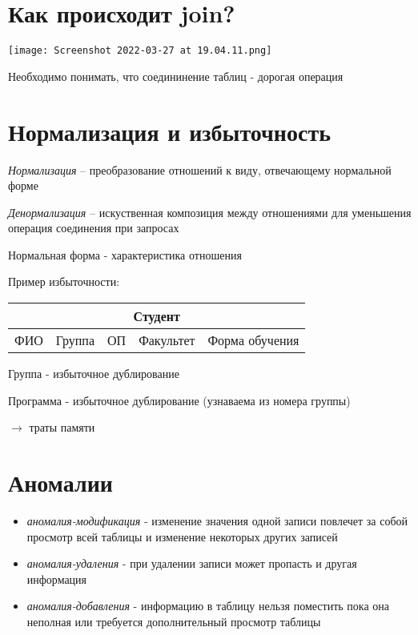 \documentclass[12pt, a4paper]{article}
\begin{document}
\section{Как происходит join?}


\texttt{[image: Screenshot 2022-03-27 at 19.04.11.png]}

Необходимо понимать, что соедининение таблиц - дорогая операция

\section{Нормализация и избыточность}

\emph{Нормализация} -- преобразование отношений к виду, отвечающему нормальной форме

\emph{Денормализация} -- искуственная композиция между отношениями для уменьшения операция соединения при запросах

Нормальная форма - характеристика отношения

Пример избыточности:

\begin{center}
    \begin{tabular}{|c|c|c|c|c|}
         \hline
         \multicolumn{5}{|c|}{Студент} \\
         \hline ФИО & Группа & ОП & Факультет & Форма обучения \\
         \hline
    \end{tabular}
\end{center}

Группа - избыточное дублирование

Программа - избыточное дублирование (узнаваема из номера группы)

$\rightarrow$ траты памяти

\section{Аномалии}

\begin{itemize}
    \item \emph{аномалия-модификация} - изменение значения одной записи повлечет за собой просмотр всей таблицы и изменение некоторых других записей
    \item \emph{аномалия-удаления} - при удалении записи может пропасть и другая информация
    \item \emph{аномалия-добавления} - информацию в таблицу нельзя поместить пока она неполная или требуется дополнительный просмотр таблицы
\end{itemize}
\end{document}
